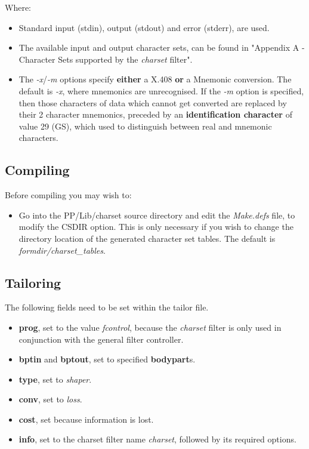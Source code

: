 \bigskip
\noindent Where:
\begin {itemize}
\item Standard input (stdin), output (stdout) and error (stderr), are used. 
\item The available input and output character sets, can be found in
"Appendix A - Character Sets supported by the {\em charset} filter".
\item The {\em -x}/{\em -m} options specify {\bf either} a X.408 
{\bf or} a Mnemonic conversion.  The default is {\em -x}, 
where mnemonics are unrecognised. 
If the {\em -m} option is specified, then those characters of data which 
cannot get converted are replaced by their 2 character mnemonics, 
preceded by an {\bf identification character} of value 29 (GS),
which used to distinguish between real and mnemonic characters.
\end {itemize}

\bigskip\bigskip
\subsection {Compiling}
\medskip

Before compiling you may wish to:

\begin {itemize}
\item Go into the PP/Lib/charset source directory and 
edit the {\em Make.defs} file, to modify the CSDIR option. This 
is only necessary if you wish to change the directory location 
of the generated character set tables. The default is
{\em formdir/charset\_tables}.
\end {itemize}


\bigskip\bigskip
\subsection {Tailoring}

\noindent The following fields need to be set within the tailor file.
\begin {itemize}
\item {\bf prog}, set to the value {\em fcontrol},
because the {\em charset} filter is only used in conjunction 
with the general filter controller. 
\item {\bf bptin} and {\bf bptout}, set to specified {\bf bodypart}s.
\item {\bf type}, set to {\em shaper}.
\item {\bf conv}, set to {\em loss}.
\item {\bf cost}, set because information is lost. 
\item {\bf info}, set to the charset filter name {\em charset}, followed 
by its required options.
\end {itemize}


